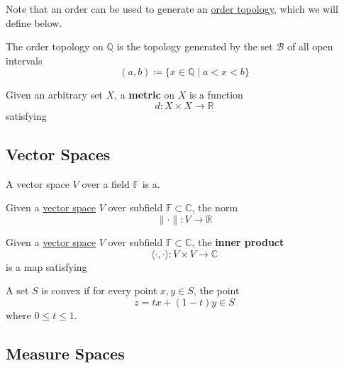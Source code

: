   \begin{definition}[Topology]
    \label{def:topology}
    
  \end{definition}

  Note that an order can be used to generate an \hyperref[pst-def:order-topology]{order topology}, which we will define below. 

  \begin{example}
    \label{ex:order-topology-on-q}
    The order topology on $\mathbb{Q}$ is the topology generated by the set $\mathscr{B}$ of all open intervals 
    \begin{equation}
      (a, b) \coloneqq \{ x \in \mathbb{Q} \mid a < x < b\}
    \end{equation}
  \end{example}

  \begin{definition}[Metric]
    \label{def:metric}
    Given an arbitrary set $X$, a \textbf{metric} on $X$ is a function 
    \begin{equation}
      d: X \times X \rightarrow \mathbb{R}
    \end{equation}
    satisfying
  \end{definition}

\subsection{Vector Spaces}

  \begin{definition}
    \label{def:vector-space}
    A vector space $V$ over a field $\mathbb{F}$ is a. 
  \end{definition}

  \begin{example}[Norm]
    \label{ex:norm}
    Given a \hyperref[def:vector-space]{vector space} $V$ over subfield $\mathbb{F} \subset \mathbb{C}$, the norm 
    \begin{equation}
      \|\cdot\| : V \rightarrow \mathbb{R}
    \end{equation}
  \end{example}

  \begin{example}
    \label{ex:inner-product}
    Given a \hyperref[def:vector-space]{vector space} $V$ over subfield $\mathbb{F} \subset \mathbb{C}$, the \textbf{inner product} 
    \begin{equation}
      \langle \cdot, \cdot \rangle : V \times V \rightarrow \mathbb{C}
    \end{equation} 
    is a map satisfying 
  \end{example}

  \begin{definition}
    \label{def:convex-sets}
    A set $S$ is convex if for every point $x, y \in S$, the point 
    \begin{equation}
      z = t x + (1 - t) y \in S
    \end{equation}
    where $0 \leq t \leq 1$. 
  \end{definition}

\subsection{Measure Spaces}


